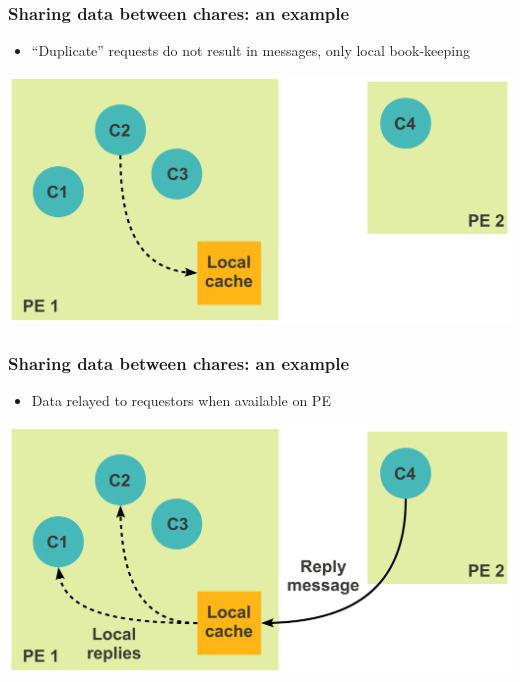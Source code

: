 \begin{frame}[fragile]
  \frametitle{Sharing data between chares: an example}
  \begin{itemize}
    \item ``Duplicate'' requests do not result in messages, only local book-keeping
  \end{itemize}
  \includegraphics[width=\textwidth]{figures/advancedOpts/fig6}
\end{frame}

\begin{frame}[fragile]
  \frametitle{Sharing data between chares: an example}
  \begin{itemize}
    \item Data relayed to requestors when available on PE
  \end{itemize}
  \includegraphics[width=\textwidth]{figures/advancedOpts/fig7}
\end{frame}

